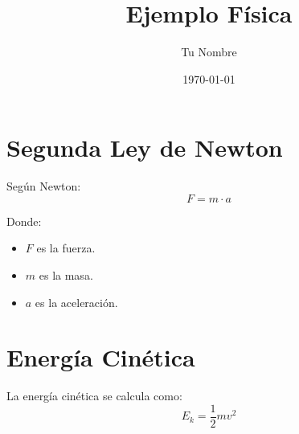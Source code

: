 \documentclass{article}
\begin{document}
\title{Ejemplo Física}
\author{Tu Nombre}
\date{\today}
\maketitle

\section{Segunda Ley de Newton}

Según Newton:
\[
F = m \cdot a
\]

Donde:
\begin{itemize}
    \item $F$ es la fuerza.
    \item $m$ es la masa.
    \item $a$ es la aceleración.
\end{itemize}

\section{Energía Cinética}

La energía cinética se calcula como:
\[
E_k = \frac{1}{2} m v^2
\]
\end{document}
